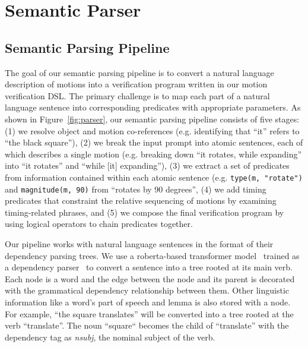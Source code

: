 \section{Semantic Parser}

\subsection{Semantic Parsing Pipeline}
\label{sec:semantic_parser}
The goal of our semantic parsing pipeline is to convert a natural language description of motions into a verification program written in our motion verification DSL.
%
The primary challenge is to map each part of a natural language sentence into corresponding predicates with appropriate parameters. 
%
As shown in Figure~\ref{fig:parser}, our semantic parsing pipeline consists of five stages: 
(1) we resolve object and motion co-references (e.g. identifying that ``it'' refers to ``the black square''),
(2) we break the input prompt into atomic sentences, each of which describes a single motion (e.g. breaking down ``it rotates, while expanding'' into ``it rotates'' and ``while [it] expanding''),
(3) we extract a set of predicates from information contained within each atomic sentence (e.g. \texttt{type(m, "rotate")} and \texttt{magnitude(m, 90)} from ``rotates by 90 degrees'',
(4) we add timing predicates that constraint the relative sequencing of motions by examining timing-related phrases, and
(5) we compose the final verification program by using logical operators to chain predicates together.

Our pipeline works with natural language sentences in the format of their dependency parsing trees.
We use a roberta-based transformer
model~\cite{liu2019roberta} trained as a dependency parser~\cite{honnibal2020spacy} to convert a sentence into a tree rooted at its main verb.
Each node is a word and the edge between the node and its parent is decorated with the grammatical dependency relationship between them. 
Other linguistic information like a word’s part of speech and lemma is also stored with a node.
For example, ``the square translates'' will be converted into a tree rooted at the verb ``translate''.
The noun ``square`` becomes the child of ``translate'' with the dependency tag as \textit{nsubj}, the nominal subject of the verb.



